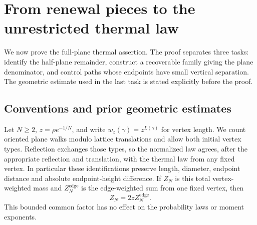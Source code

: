 \section{From renewal pieces to the unrestricted thermal law}\label{R:sec:thermal}
We now prove the full-plane thermal assertion. The proof separates three tasks: identify the half-plane remainder, construct a recoverable family giving the plane denominator, and control paths whose endpoints have small vertical separation. The geometric estimate used in the last task is stated explicitly before the proof.

\subsection{Conventions and prior geometric estimates}
Let $N\ge2$, $z=\rho e^{-1/N}$, and write $w_z(\gamma)=z^{L(\gamma)}$ for vertex length. We count oriented plane walks modulo lattice translations and allow both initial vertex types. Reflection exchanges those types, so the normalized law agrees, after the appropriate reflection and translation, with the thermal law from any fixed vertex. In particular these identifications preserve length, diameter, endpoint distance and absolute endpoint-height difference. If $Z_N$ is this total vertex-weighted mass and $Z_N^{\mathrm{edge}}$ is the edge-weighted sum from one fixed vertex, then
\[
 Z_N=2z Z_N^{\mathrm{edge}}.
\]
This bounded common factor has no effect on the probability laws or moment exponents.


